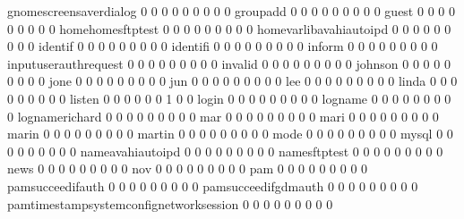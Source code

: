 \documentclass[compress,8pt]{beamer}
\begin{document}
\begin{frame}
\begin{Schunk}
  gnomescreensaverdialog                     0   0   0   0   0   0   0   0   0
  groupadd                                   0   0   0   0   0   0   0   0   0
  guest                                      0   0   0   0   0   0   0   0   0
  homehomesftptest                           0   0   0   0   0   0   0   0   0
  homevarlibavahiautoipd                     0   0   0   0   0   0   0   0   0
  identif                                    0   0   0   0   0   0   0   0   0
  identifi                                   0   0   0   0   0   0   0   0   0
  inform                                     0   0   0   0   0   0   0   0   0
  inputuserauthrequest                       0   0   0   0   0   0   0   0   0
  invalid                                    0   0   0   0   0   0   0   0   0
  johnson                                    0   0   0   0   0   0   0   0   0
  jone                                       0   0   0   0   0   0   0   0   0
  jun                                        0   0   0   0   0   0   0   0   0
  lee                                        0   0   0   0   0   0   0   0   0
  linda                                      0   0   0   0   0   0   0   0   0
  listen                                     0   0   0   0   0   0   1   0   0
  login                                      0   0   0   0   0   0   0   0   0
  logname                                    0   0   0   0   0   0   0   0   0
  lognamerichard                             0   0   0   0   0   0   0   0   0
  mar                                        0   0   0   0   0   0   0   0   0
  mari                                       0   0   0   0   0   0   0   0   0
  marin                                      0   0   0   0   0   0   0   0   0
  martin                                     0   0   0   0   0   0   0   0   0
  mode                                       0   0   0   0   0   0   0   0   0
  mysql                                      0   0   0   0   0   0   0   0   0
  nameavahiautoipd                           0   0   0   0   0   0   0   0   0
  namesftptest                               0   0   0   0   0   0   0   0   0
  news                                       0   0   0   0   0   0   0   0   0
  nov                                        0   0   0   0   0   0   0   0   0
  pam                                        0   0   0   0   0   0   0   0   0
  pamsucceedifauth                           0   0   0   0   0   0   0   0   0
  pamsucceedifgdmauth                        0   0   0   0   0   0   0   0   0
  pamtimestampsystemconfignetworksession     0   0   0   0   0   0   0   0   0

\end{Schunk}
\end{frame}
\end{document}
